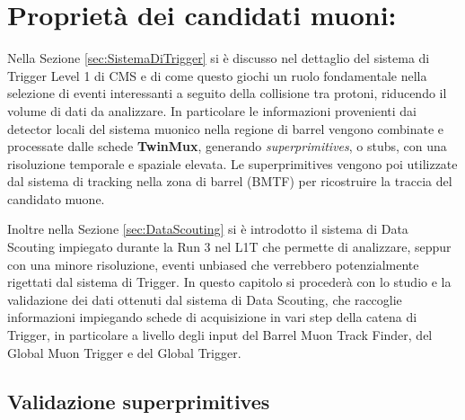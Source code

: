 \chapter{Proprietà dei candidati muoni:}
\label{cap:SecondoCapitolo}

Nella Sezione \ref{sec:SistemaDiTrigger} si è discusso nel dettaglio del sistema di Trigger Level 1 di CMS e di come questo giochi un ruolo fondamentale nella selezione di eventi interessanti a seguito della collisione tra protoni, riducendo il volume di dati da analizzare. In particolare le informazioni provenienti dai detector locali del sistema muonico nella regione di barrel vengono combinate e processate dalle schede \textbf{TwinMux}, generando \textit{superprimitives}, o stubs, con una risoluzione temporale e spaziale elevata. Le superprimitives vengono poi utilizzate dal sistema di tracking nella zona di barrel (BMTF) per ricostruire la traccia del candidato muone.

Inoltre nella Sezione \ref{sec:DataScouting} si è introdotto il sistema di Data Scouting impiegato durante la Run 3 nel L1T che permette di analizzare, seppur con una minore risoluzione, eventi unbiased che verrebbero potenzialmente rigettati dal sistema di Trigger. In questo capitolo si procederà con lo studio e la validazione dei dati ottenuti dal sistema di Data Scouting, che raccoglie informazioni impiegando schede di acquisizione in vari step della catena di Trigger, in particolare a livello degli input del Barrel Muon Track Finder, del Global Muon Trigger e del Global Trigger.


\section{Validazione superprimitives}
\label{sec:Superprimitives}

